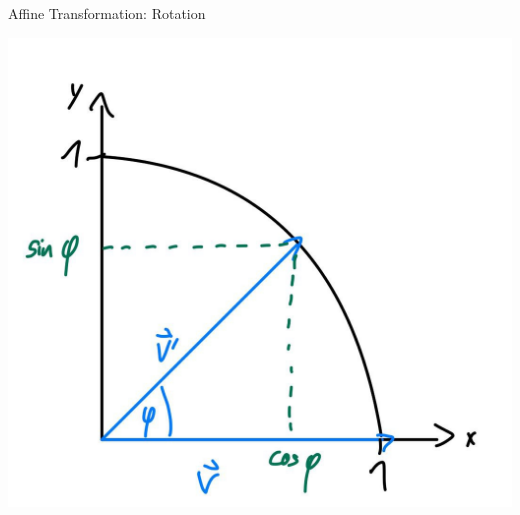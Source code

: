\documentclass[10pt,aspectratio=169]{beamer}
\begin{document}
\begin{frame}{Affine Transformation: Rotation}
\begin{minipage}{4cm}
        \includegraphics[scale=0.1]{rotation}  
      \end{minipage}
  \end{frame}
\end{document}
